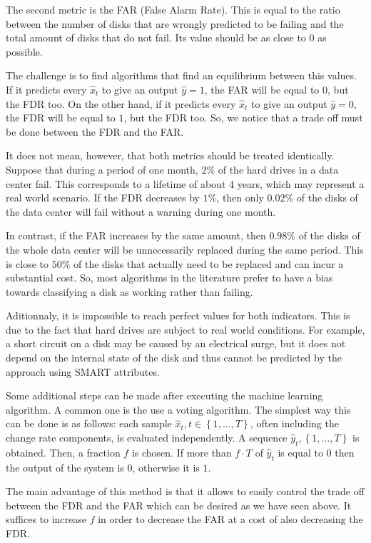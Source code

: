 The second metric is the FAR (False Alarm Rate).
This is equal to the ratio between the number of disks that are wrongly predicted to be failing and the total amount of disks that do not fail.
Its value should be as close to $0$ as possible.

The challenge is to find algorithms that find an equilibrium between this values.
If it predicts every $\hat{x}_t$ to give an output $\hat{y} = 1$, the FAR will be equal to $0$, but the FDR too.
On the other hand, if it predicts every $\hat{x}_t$ to give an output $\hat{y} = 0$, the FDR will be equal to $1$, but the FDR too.
So, we notice that a trade off must be done between the FDR and the FAR.

It does not mean, however, that both metrics should be treated identically.
Suppose that during a period of one month, $2\%$ of the hard drives in a data center fail.
This corresponds to a lifetime of about 4 years, which may represent a real world scenario.
If the FDR decreases by $1\%$, then only $0.02\%$ of the disks of the data center will fail without a warning during one month.

In contrast, if the FAR increases by the same amount, then $0.98\%$ of the disks of the whole data center will be unnecessarily replaced during the same period.
This is close to $50\%$ of the disks that actually need to be replaced and can incur a substantial cost.
So, most algorithms in the literature prefer to have a bias towards classifying a disk as working rather than failing.

Aditionnaly, it is impossible to reach perfect values for both indicators.
This is due to the fact that hard drives are subject to real world conditions.
For example, a short circuit on a disk may be caused by an electrical surge, but it does not depend on the internal state of the disk and thus cannot be predicted by the approach using SMART attributes.

Some additional steps can be made after executing the machine learning algorithm.
A common one is the use a voting algorithm.
The simplest way this can be done is as follows\cite{Shen18}: each sample $\hat{x}_{t}, t\in\left\{1,\dots,T\right\}$, often including the change rate components, is evaluated independently.
A sequence $\hat{y}_t, \left\{1,\dots,T\right\}$ is obtained.
Then, a fraction $f$ is chosen.
If more than $f\cdot T$ of $\hat{y}_t$ is equal to $0$ then the output of the system is $0$, otherwise it is $1$.

The main advantage of this method is that it allows to easily control the trade off between the FDR and the FAR which can be desired as we have seen above.
It suffices to increase $f$ in order to decrease the FAR at a cost of also decreasing the FDR.
